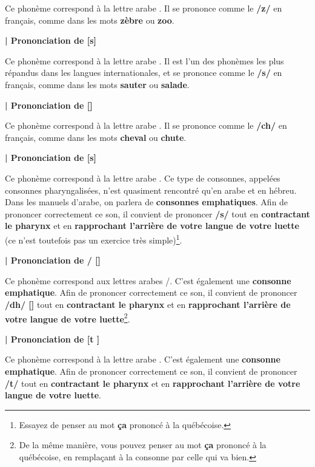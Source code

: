 Ce phonème correspond à la lettre arabe . Il se prononce comme le \textbf{/z/} en français, comme dans les mots \textbf{zèbre} ou \textbf{zoo}.


\textbf{| Prononciation de  [s]}

Ce phonème correspond à la lettre arabe . Il est l'un des phonèmes les plus répandus dans les langues internationales, et se prononce comme le \textbf{/s/} en français, comme dans les mots \textbf{sauter} ou \textbf{salade}.



\textbf{| Prononciation de  [\textesh]}

Ce phonème correspond à la lettre arabe . Il se prononce comme le \textbf{/ch/} en français, comme dans les mots \textbf{cheval} ou \textbf{chute}.


\textbf{| Prononciation de  [s\super \textrevglotstop]}

Ce phonème correspond à la lettre arabe . Ce type de consonnes, appelées consonnes pharyngalisées, n'est quasiment rencontré qu'en arabe et en hébreu. Dans les manuels d'arabe, on parlera de \textbf{consonnes emphatiques}. Afin de prononcer correctement ce son, il convient de prononcer \textbf{/s/} tout en \textbf{contractant le pharynx} et en \textbf{rapprochant l'arrière de votre langue de votre luette} (ce n'est toutefois pas un exercice très simple)\footnote{Essayez de penser au mot \textbf{ça} prononcé à la québécoise.}. 



\textbf{| Prononciation de / [\dh \super \textrevglotstop]}

Ce phonème correspond aux lettres arabes /. C'est également une \textbf{consonne emphatique}. Afin de prononcer correctement ce son, il convient de prononcer \textbf{/dh/ [\dh]} tout en \textbf{contractant le pharynx} et en \textbf{rapprochant l'arrière de votre langue de votre luette}\footnote{De la même manière, vous pouvez penser au mot \textbf{ça} prononcé à la québécoise, en remplaçant à la consonne par celle qui va bien.}. 


\textbf{| Prononciation de  [t \super \textrevglotstop]}

Ce phonème correspond à la lettre arabe . C'est également une \textbf{consonne emphatique}. Afin de prononcer correctement ce son, il convient de prononcer \textbf{/t/} tout en \textbf{contractant le pharynx} et en \textbf{rapprochant l'arrière de votre langue de votre luette}. 


